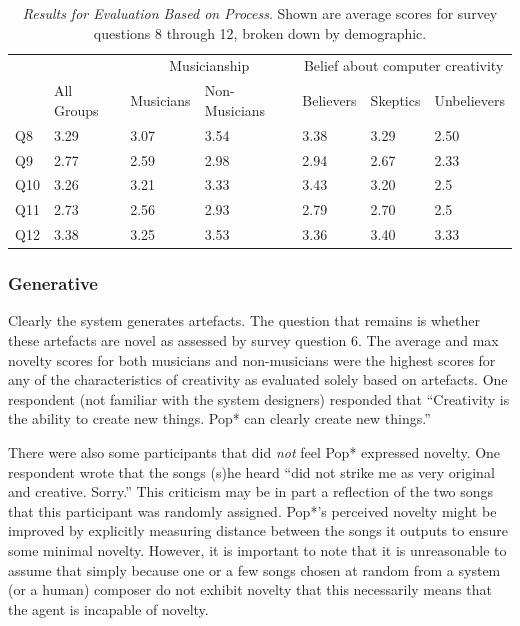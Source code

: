 \documentclass[phd,electronic,oneside,twosidetoc,letterpaper,chaptercenter,parttop,lol,lof,lot]{byumsphd}
\begin{document}
\begin{table}[]
\centering
\begin{tabular}{@{}l|l|ll|lll|@{}}
                                        &            & \multicolumn{2}{c|}{Musicianship} & \multicolumn{3}{c|}{Belief about computer creativity} \\
                                        & All Groups & Musicians     & Non-Musicians    & Believers       & Skeptics       & Unbelievers       \\ \midrule
Q8         & 3.29       & 3.07          & 3.54             & 3.38            & 3.29           & 2.50              \\
Q9 & 2.77       & 2.59          & 2.98             & 2.94            & 2.67           & 2.33              \\
Q10                      & 3.26       & 3.21          & 3.33             & 3.43            & 3.20           & 2.5               \\
Q11           & 2.73       & 2.56          & 2.93             & 2.79            & 2.70           & 2.5               \\
Q12            & 3.38       & 3.25          & 3.53             & 3.36            & 3.40           & 3.33            \\
\end{tabular}
\caption{\label{tab:results2}\textit{Results for Evaluation Based on Process}. Shown are average scores for survey questions 8 through 12, broken down by demographic.}
\end{table}

\subsubsection{Generative}

Clearly the system generates artefacts. The question that remains is whether these artefacts are novel as assessed by survey question 6. The average and max novelty scores for both musicians and non-musicians were the highest scores for any of the characteristics of creativity as evaluated solely based on artefacts. One respondent (not familiar with the system designers) responded that ``Creativity is the ability to create new things. Pop* can clearly create new things.''

There were also some participants that did \textit{not} feel Pop* expressed novelty. One respondent wrote that the songs (s)he heard ``did not strike me as very original and creative. Sorry.'' This criticism may be in part a reflection of the two songs that this participant was randomly assigned. Pop*'s perceived novelty might be improved by explicitly measuring distance between the songs it outputs to ensure some minimal novelty. However, it is important to note that it is unreasonable to assume that simply because one or a few songs chosen at random from a system (or a human) composer do not exhibit novelty that this necessarily means that the agent is incapable of novelty.
\end{document}
